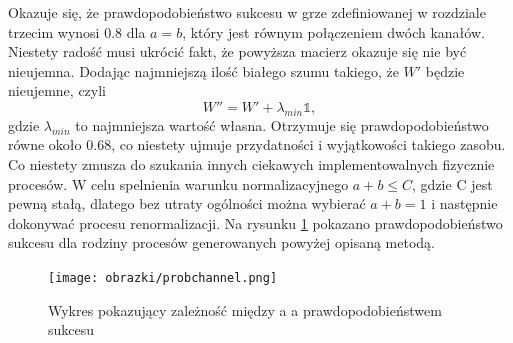 \documentclass[10pt]{article} %
\newcommand{\I}{\mathbb{1}}
\begin{document}
Okazuje się, że prawdopodobieństwo sukcesu w grze zdefiniowanej w rozdziale trzecim wynosi $0.8$ dla $a=b$, który jest równym połączeniem dwóch kanałów.
Niestety radość musi ukrócić fakt, że powyższa macierz okazuje się nie być nieujemna. Dodając najmniejszą ilość białego szumu takiego, że $W'$ będzie nieujemne, czyli
\begin{equation}
W'' = W' + \lambda_{min} \I,
\end{equation} gdzie $\lambda_{min}$ to najmniejsza wartość własna.
Otrzymuje się prawdopodobieństwo równe około $0.68$, co niestety ujmuje przydatności i wyjątkowości takiego zasobu. Co niestety zmusza do szukania innych ciekawych implementowalnych fizycznie procesów.
W celu spelnienia warunku normalizacyjnego $a + b \leq C$, gdzie C jest pewną stałą, dlatego bez utraty ogólności można wybierać $a + b = 1$ i następnie dokonywać procesu renormalizacji. Na rysunku \ref{fig:bichannel} pokazano prawdopodobieństwo sukcesu dla rodziny procesów generowanych powyżej opisaną metodą.
\begin{figure}[t]
\centering

\texttt{[image: obrazki/probchannel.png]}
\caption{Wykres pokazujący zależność między a a prawdopodobieństwem sukcesu}
\label{fig:bichannel}
\end{figure}
\end{document}
